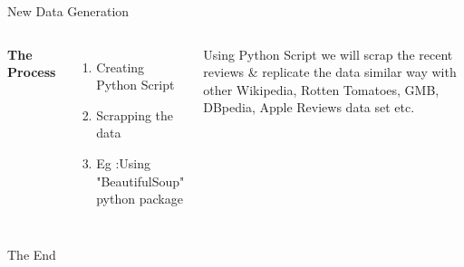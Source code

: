 \documentclass[aspectratio=169,xcolor=dvipsnames]{beamer}
\begin{document}

\begin{frame}{New Data Generation}
    \begin{columns}[c] %

        \textbf{The Process}
        \begin{enumerate}
            \item Creating Python Script
            \item Scrapping the data 
            \item Eg :Using "BeautifulSoup" python package
        \end{enumerate}

         Using Python Script we will scrap the recent reviews & replicate the data similar way with other  Wikipedia, Rotten Tomatoes, GMB, DBpedia, Apple Reviews data set etc.

    \end{columns}
\end{frame}



\begin{frame}
    \Huge{\centerline{The End}}
\end{frame}

\end{document}
